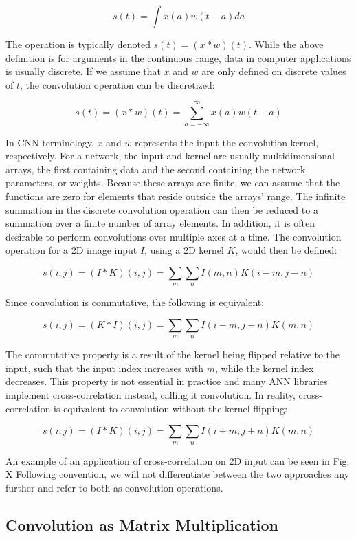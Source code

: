 $$s(t) = \int x(a)w(t-a) da$$

\noindent The operation is typically denoted $s(t) = (x*w)(t)$. While the above definition is for arguments in the continuous range, data in computer applications is usually discrete. If we assume that $x$ and $w$ are only defined on discrete values of $t$, the convolution operation can be discretized:

$$s(t) = (x*w)(t) = \sum_{a=-\infty}^{\infty} x(a)w(t-a)$$

\noindent In CNN terminology, $x$ and $w$ represents the input the convolution kernel, respectively. For a network, the input and kernel are usually multidimensional arrays, the first containing data and the second containing the network parameters, or weights. Because these arrays are finite, we can assume that the functions are zero for elements that reside outside the arrays' range. The infinite summation in the discrete convolution operation can then be reduced to a summation over a finite number of array elements. In addition, it is often desirable to perform convolutions over multiple axes at a time. The convolution operation for a 2D image input $I$, using a 2D kernel $K$, would then be defined:

$$s(i, j) = (I*K)(i, j) = \sum_{m} \sum_{n} I(m, n) K(i-m, j-n)$$

\noindent Since convolution is commutative, the following is equivalent:

$$s(i, j) = (K*I)(i, j) = \sum_{m} \sum_{n} I(i-m, j-n) K(m, n)$$

\noindent The commutative property is a result of the kernel being flipped relative to the input, such that the input index increases with $m$, while the kernel index decreases. This property is not essential in practice and many ANN libraries implement cross-correlation instead, calling it convolution. In reality, cross-correlation is equivalent to convolution without the kernel flipping:

$$s(i, j) = (I*K)(i, j) = \sum_{m} \sum_{n} I(i+m, j+n) K(m, n)$$

\noindent An example of an application of cross-correlation on 2D input can be seen in Fig. X Following convention, we will not differentiate between the two approaches any further and refer to both as convolution operations. 
 
\subsection{Convolution as Matrix Multiplication}
 
